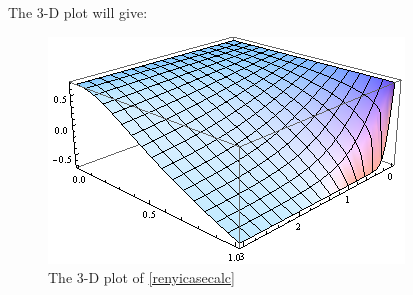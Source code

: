 \noindent
The 3-D plot will give:
\begin{figure}[H]
\begin{center}
\includegraphics[scale=0.9]{figures/3DplotRenyi.png}
\caption{The 3-D plot of \eqref{renyicasecalc}}
\label{figr4}
\end{center}
\end{figure}